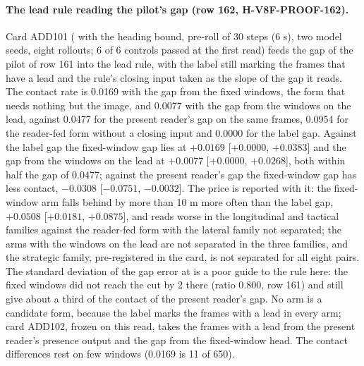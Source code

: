 \paragraph{The lead rule reading the pilot's gap (row 162, H-V8F-PROOF-162).} Card ADD101 ( with the heading bound, pre-roll of 30 steps (6 s), two model seeds, eight rollouts; 6 of 6 controls passed at the first read) feeds the gap of the pilot of row 161 into the lead rule, with the label still marking the frames that have a lead and the rule's closing input taken as the slope of the gap it reads. The contact rate is 0.0169 with the gap from the fixed windows, the form that needs nothing but the image, and 0.0077 with the gap from the windows on the lead, against 0.0477 for the present reader's gap on the same frames, 0.0954 for the reader-fed form without a closing input and 0.0000 for the label gap. Against the label gap the fixed-window gap lies at $+0.0169$ [$+0.0000$, $+0.0383$] and the gap from the windows on the lead at $+0.0077$ [$+0.0000$, $+0.0268$], both within half the gap of 0.0477; against the present reader's gap the fixed-window gap has less contact, $-0.0308$ [$-0.0751$, $-0.0032$]. The price is reported with it: the fixed-window arm falls behind by more than 10 m more often than the label gap, $+0.0508$ [$+0.0181$, $+0.0875$], and reads worse in the longitudinal and tactical families against the reader-fed form with the lateral family not separated; the arms with the windows on the lead are not separated in the three families, and the strategic family, pre-registered in the card, is not separated for all eight pairs. The standard deviation of the gap error at  is a poor guide to the rule here: the fixed windows did not reach the cut by 2 there (ratio 0.800, row 161) and still give about a third of the contact of the present reader's gap. No arm is a candidate form, because the label marks the frames with a lead in every arm; card ADD102, frozen on this read, takes the frames with a lead from the present reader's presence output and the gap from the fixed-window head. The contact differences rest on few windows (0.0169 is 11 of 650).

